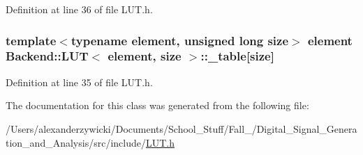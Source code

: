 Definition at line 36 of file L\+U\+T.\+h.

\hypertarget{classBackend_1_1LUT_ae70f3f0c9aaa9e0b85517d8e2c61d9a5}{
\subsubsection[{\+\_\+table}]{\setlength{\rightskip}{0pt plus 5cm}template$<$typename element, unsigned long size$>$ element {\bf Backend\+::\+L\+U\+T}$<$ element, size $>$\+::\+\_\+table\mbox{[}size\mbox{]}\hspace{0.3cm}{\ttfamily [protected]}}}\label{classBackend_1_1LUT_ae70f3f0c9aaa9e0b85517d8e2c61d9a5}


Definition at line 35 of file L\+U\+T.\+h.



The documentation for this class was generated from the following file\+:\begin{DoxyCompactItemize}
\item 
/\+Users/alexanderzywicki/\+Documents/\+School\+\_\+\+Stuff/\+Fall\+\_/\+Digital\+\_\+\+Signal\+\_\+\+Generation\+\_\+and\+\_\+\+Analysis/src/include/\hyperlink{LUT_8h}{L\+U\+T.\+h}\end{DoxyCompactItemize}
